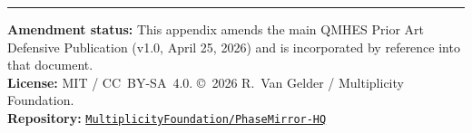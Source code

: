 \documentclass[12pt,letterpaper]{article}
\theoremstyle{plain}
\theoremstyle{definition}
\begin{document}
\vfill\hrule\vspace{0.5em}
\small
\noindent\textbf{Amendment status:} This appendix amends the main
QMHES Prior Art Defensive Publication (v1.0, April 25, 2026) and
is incorporated by reference into that document.\\
\noindent\textbf{License:} MIT / CC~BY-SA~4.0. \copyright\ 2026
R.\ Van Gelder / Multiplicity Foundation.\\
\noindent\textbf{Repository:}
\href{https://github.com/MultiplicityFoundation/PhaseMirror-HQ}%
{\texttt{MultiplicityFoundation/PhaseMirror-HQ}}
\nocite{*}
  

\end{document}
